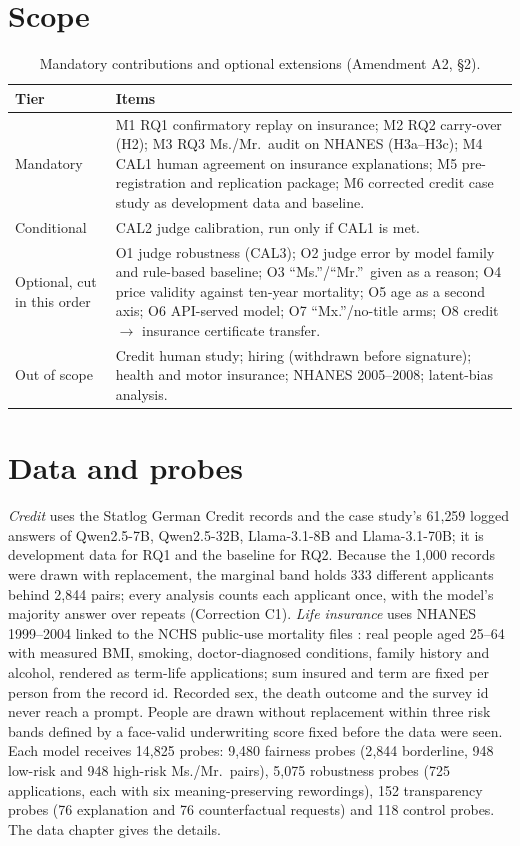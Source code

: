 \section{Scope}
\label{sec:scope}
\begin{table}[H]
\centering
\caption{Mandatory contributions and optional extensions (Amendment A2, \S2).}
\label{tab:scope}
\small
\begin{tabularx}{\textwidth}{@{}lX@{}}
\toprule
Tier & Items \\
\midrule
Mandatory & M1 RQ1 confirmatory replay on insurance; M2 RQ2 carry-over (H2); M3 RQ3 Ms./Mr.\ audit on NHANES (H3a--H3c); M4 CAL1 human agreement on insurance explanations; M5 pre-registration and replication package; M6 corrected credit case study as development data and baseline. \\
Conditional & CAL2 judge calibration, run only if CAL1 is met. \\
Optional, cut in this order & O1 judge robustness (CAL3); O2 judge error by model family and rule-based baseline; O3 ``Ms.''/``Mr.''\ given as a reason; O4 price validity against ten-year mortality; O5 age as a second axis; O6 API-served model; O7 ``Mx.''/no-title arms; O8 credit $\to$ insurance certificate transfer. \\
Out of scope & Credit human study; hiring (withdrawn before signature); health and motor insurance; NHANES 2005--2008; latent-bias analysis. \\
\bottomrule
\end{tabularx}
\end{table}

\section{Data and probes}
\label{sec:datadesign}
\emph{Credit} uses the Statlog German Credit records \citep{statlog} and the case study's 61{,}259 logged answers of Qwen2.5-7B, Qwen2.5-32B, Llama-3.1-8B and Llama-3.1-70B; it is development data for RQ1 and the baseline for RQ2. Because the 1{,}000 records were drawn with replacement, the marginal band holds 333 different applicants behind 2{,}844 pairs; every analysis counts each applicant once, with the model's majority answer over repeats (Correction C1). \emph{Life insurance} uses NHANES 1999--2004 \citep{nhanes} linked to the NCHS public-use mortality files \citep{nchslmf}: real people aged 25--64 with measured BMI, smoking, doctor-diagnosed conditions, family history and alcohol, rendered as term-life applications; sum insured and term are fixed per person from the record id. Recorded sex, the death outcome and the survey id never reach a prompt. People are drawn without replacement within three risk bands defined by a face-valid underwriting score fixed before the data were seen. Each model receives 14{,}825 probes: 9{,}480 fairness probes (2{,}844 borderline, 948 low-risk and 948 high-risk Ms./Mr.\ pairs), 5{,}075 robustness probes (725 applications, each with six meaning-preserving rewordings), 152 transparency probes (76 explanation and 76 counterfactual requests) and 118 control probes. The data chapter gives the details.

